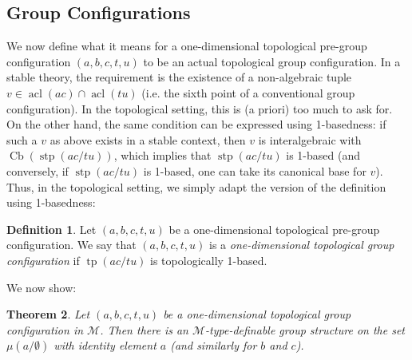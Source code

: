 \documentclass{amsart}
\newtheorem{theorem}{Theorem}[section]
\theoremstyle{definition}
\newtheorem{definition}[theorem]{Definition}
\newcommand{\acl}{\operatorname{acl}}
\newcommand{\tp}{\operatorname{tp}}
\begin{document}
    \subsection{Group Configurations}

    We now define what it means for a one-dimensional topological pre-group configuration $(a,b,c,t,u)$ to be an actual topological group configuration. In a stable theory, the requirement is the existence of a non-algebraic tuple $v\in\acl(ac)\cap\acl(tu)$ (i.e. the sixth point of a conventional group configuration). In the topological setting, this is (a priori) too much to ask for. On the other hand, the same condition can be expressed using 1-basedness: if such a $v$ as above exists in a stable context, then $v$ is interalgebraic with $\operatorname{Cb}(\operatorname{stp}(ac/tu))$, which implies that $\operatorname{stp}(ac/tu)$ is 1-based (and conversely, if $\operatorname{stp}(ac/tu)$ is 1-based, one can take its canonical base for $v$). Thus, in the topological setting, we simply adapt the version of the definition using 1-basedness:

    \begin{definition}
        Let $(a,b,c,t,u)$ be a one-dimensional topological pre-group configuration. We say that $(a,b,c,t,u)$ is a \textit{one-dimensional topological group configuration} if $\tp(ac/tu)$ is topologically 1-based.
    \end{definition}

 We now show:

    \begin{theorem}\label{T: gconf}
        Let $(a,b,c,t,u)$ be a one-dimensional topological group configuration in $\mathcal M$. Then there is an $\mathcal M$-type-definable group structure on the set $\mu(a/\emptyset)$ with identity element $a$ (and similarly for $b$ and $c$).
    \end{theorem}
\end{document}
